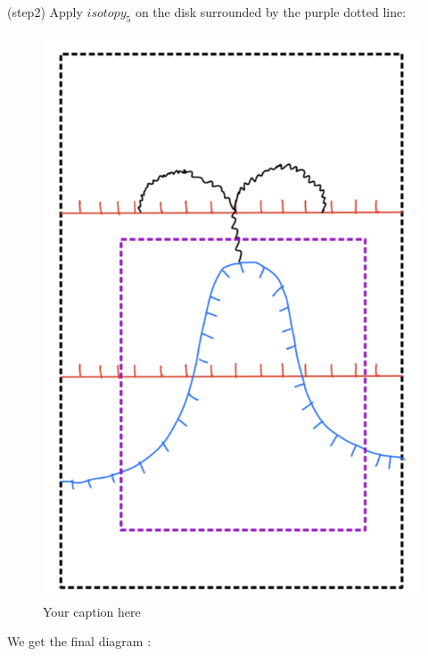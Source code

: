 (step2) Apply $isotopy_5$ on the disk surrounded by the purple dotted line:
\begin{figure}[H] %
    \centering
    \includegraphics[width=\linewidth]{diagrams/lemma8/5.png} %
    \caption{Your caption here}
    \label{fig:your-label}
\end{figure}

We get the final diagram :

